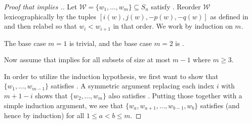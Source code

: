 \begin{proof}[Proof that  implies .]
    Let $\mathcal{W}= \{w_1,\dots,w_m\} \subseteq S_n$ satisfy . 
    Reorder $\mathcal{W}$ lexicographically by the tuples $[i(w),j(w),-p(w),-q(w)]$ as defined in  and then relabel so that $w_i<w_{i+1}$ in that order.
    We work by induction on $m$.  

    The base case $m=1$ is trivial, and the base case $m=2$ is .
    
    Now assume that  implies  for all subsets of size at most $m-1$ where $m\geq 3$. 

    In order to utilize the induction hypothesis, we first want to show that $\{w_1,\dots,w_{m-1}\}$ satisfies .
    A symmetric argument replacing each index $i$ with $m+1-i$ shows that $\{w_2,\dots,w_m\}$ also satisfies .
    Putting those together with a simple induction argument, we see that $\{w_a,w_{a+1},\dots,w_{b-1},w_b\}$ satisfies  (and hence  by induction) for all $1\leq a<b\leq m$.


\end{proof}
